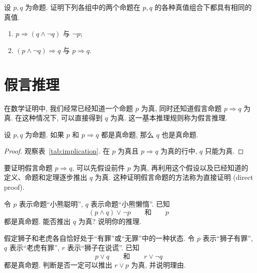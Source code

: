 \documentclass[usesamecnt, thmcnt=section, lang=cn, newtx, 10pt, scheme=chinese]{elegantbook}
\begin{document}
\begin{exercise}
\label{ex:basic-logic-02}
设 $p,q$ 为命题. 证明下列各组中的两个命题在 $p,q$ 的各种真值组合下都具有相同的真值.
\begin{enumerate}[label=\rm(\arabic*)]
  \item $p\Rightarrow(q\wedge\neg q)$ 与 $\neg p$;
  \item $(p\wedge\neg q)\Rightarrow q$ 与 $p\Rightarrow q$.
\end{enumerate}
\end{exercise}

\section{假言推理}

在数学证明中, 我们经常已经知道一个命题 $p$ 为真, 同时还知道假言命题 $p\Rightarrow q$ 为真. 在这种情况下, 可以直接得到 $q$ 为真. 这一基本推理规则称为假言推理.

\begin{theorem}\label{thm:modus-ponens}
设 $p,q$ 为命题. 如果 $p$ 和 $p\Rightarrow q$ 都是真命题, 那么 $q$ 也是真命题.
\end{theorem}

\begin{proof}
观察表~\ref{tab:implication}. 在 $p$ 为真且 $p\Rightarrow q$ 为真的行中, $q$ 只能为真.
\end{proof}

\begin{definition}[直接证明]
要证明假言命题 $p\Rightarrow q$, 可以先假设前件 $p$ 为真, 再利用这个假设以及已经知道的定义、命题和定理逐步推出 $q$ 为真. 这种证明假言命题的方法称为{\color{blue}直接证明 (direct proof)}.
\end{definition}

\begin{exercise}
\label{ex:basic-logic-04}
令 $p$ 表示命题``小熊聪明'', $q$ 表示命题``小熊懒惰''. 已知
\[
 (p\wedge q)\vee\neg p
 \qquad\text{和}\qquad
 p
\]
都是真命题. 能否推出 $q$ 为真? 说明你的推理.
\end{exercise}

\begin{exercise}
\label{ex:basic-logic-05}
假定狮子和老虎各自恰好处于``有罪''或``无罪''中的一种状态. 令 $p$ 表示``狮子有罪'', $q$ 表示``老虎有罪'', $r$ 表示``狮子在说谎''. 已知
\[
 p\vee q
 \qquad\text{和}\qquad
 r\vee\neg q
\]
都是真命题. 判断是否一定可以推出 $r\vee p$ 为真, 并说明理由.
\end{exercise}
\end{document}
